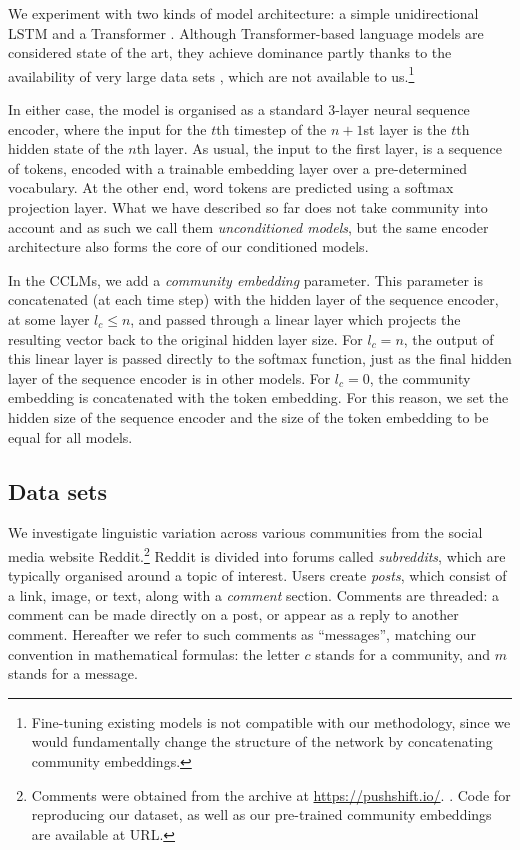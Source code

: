 \documentclass[11pt]{article}
\begin{document}
We experiment with two kinds of model architecture: a simple
unidirectional LSTM \citep{Hochreiter1997} and a Transformer
\citep{Vaswani2017}. Although Transformer-based language models are considered
state of the art, they achieve dominance partly thanks to the
availability of very large data sets \citep[e.g.,][]{Devlin2019,Brown2020},
which are not available to us.\footnote{Fine-tuning existing models
  is not compatible with our methodology, since we would fundamentally
  change the structure of the network by concatenating
  community embeddings.} 

In either case, the model is organised as a
standard $3$-layer neural sequence encoder, where the input for the
$t$th timestep of the $n+1$st layer is the $t$th hidden state of the 
$n$th layer.
As usual, the input to the first layer, is a sequence of tokens,
encoded with a trainable embedding layer over a pre-determined vocabulary.
At the other end, word tokens are predicted using a softmax projection 
layer. What we have described so far does not take community into account
and as such we call them \emph{unconditioned models}, but the same
encoder architecture also forms the core of our conditioned models.

In the CCLMs, we add a \emph{community embedding} parameter.
This parameter is concatenated (at each time step) with the hidden layer of the
sequence encoder, at some layer $l_c \leq n$, and passed through a
linear layer which projects the resulting vector back to the original
hidden layer size.  For $l_c = n$, the output of this linear layer is
passed directly to the softmax function, just as the final hidden
layer of the sequence encoder is in other models.  For $l_c=0$, the
community embedding is concatenated with the token embedding.  For
this reason, we set the hidden size of the sequence encoder and the
size of the token embedding to be equal for all models.


\subsection{Data sets}\label{sec:data}

We investigate linguistic variation across various communities 
from the social media website Reddit.\footnote{Comments were obtained
  from the archive at \url{https://pushshift.io/}.
  \cite{Baumgartner2020}. Code for reproducing our dataset, as well as
 our pre-trained community embeddings are available at URL.} %
%
Reddit is divided into forums called \textit{subreddits}, 
which are typically organised around a topic of interest. 
Users create \textit{posts}, which consist of a link, image, 
or text, along with a \emph{comment} section. 
Comments are threaded: a comment can be made directly on a post,
or appear as a reply to another comment.
%
Hereafter we refer to such comments as ``messages'', matching our
convention in mathematical formulas: the letter $c$ stands for a
community, and $m$ stands for a message.
\end{document}
